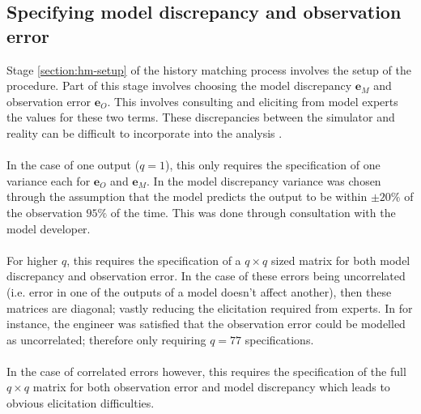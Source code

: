 \documentclass{article}
\newcommand{\numOutputs}{q}
\newcommand{\obsErrorqD}{\mathbf{e}_O}
\newcommand{\modelDiscqD}{\mathbf{e}_M}
\begin{document}
\subsection{Specifying model discrepancy and observation error}
Stage \ref{section:hm-setup} of the history matching process involves the setup of the procedure. Part of this stage involves choosing the model discrepancy $\modelDiscqD$ and observation error $\obsErrorqD$. This involves consulting and eliciting from model experts the values for these two terms. These discrepancies between the simulator and reality can be difficult to incorporate into the analysis \citep{Craig1996}.\\\\
In the case of one output ($\numOutputs=1$), this only requires the specification of one variance each for $\obsErrorqD$ and $\modelDiscqD$. In \citet{Dunne2022} the model discrepancy variance was chosen through the assumption that the model predicts the output to be within $\pm 20\%$ of the observation $95\%$ of the time. This was done through consultation with the model developer.\\\\
For higher $\numOutputs$, this requires the specification of a $\numOutputs \times \numOutputs$ sized matrix for both model discrepancy and observation error. In the case of these errors being uncorrelated (i.e. error in one of the outputs of a model doesn't affect another), then these matrices are diagonal; vastly reducing the elicitation required from experts. In \citet{Craig1997} for instance, the engineer was satisfied that the observation error could be modelled as uncorrelated; therefore only requiring $\numOutputs=77$ specifications.\\\\
In the case of correlated errors however, this requires the specification of the full $\numOutputs \times \numOutputs$ matrix for both observation error and model discrepancy which leads to obvious elicitation difficulties.
\end{document}
